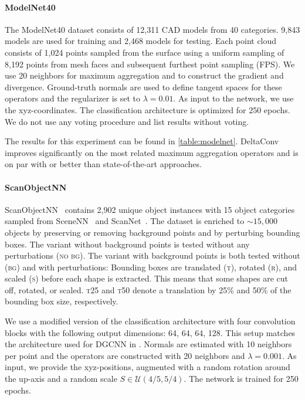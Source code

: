 \documentclass[acmtog, authorversion]{acmart}
\begin{document}
\paragraph{ModelNet40}
The ModelNet40 dataset \cite{Wu2015} consists of 12,311 CAD models from 40 categories. 9,843 models are used for training and 2,468 models for testing. Each point cloud consists of 1,024 points sampled from the surface using a uniform sampling of 8,192 points from mesh faces and subsequent furthest point sampling (FPS). We use 20 neighbors for maximum aggregation and to construct the gradient and divergence. Ground-truth normals are used to define tangent spaces for these operators and the regularizer is set to $\lambda=0.01$. As input to the network, we use the xyz-coordinates. The classification architecture is optimized for 250 epochs. We do not use any voting procedure and list results without voting.

The results for this experiment can be found in \autoref{table:modelnet}. DeltaConv improves significantly on the most related maximum aggregation operators and is on par with or better than state-of-the-art approaches.

\paragraph{ScanObjectNN}
ScanObjectNN~\cite{uy-scanobjectnn-iccv19} contains 2,902 unique object instances with 15 object categories sampled from SceneNN~\cite{scenenn-3dv16} and ScanNet~\cite{dai2017scannet}. The dataset is enriched to $\sim15,000$ objects by preserving or removing background points and by perturbing bounding boxes. The variant without background points is tested without any perturbations (\textsc{no bg}). The variant with background points is both tested without (\textsc{bg}) and with perturbations: Bounding boxes are translated (\textsc{t}), rotated (\textsc{r}), and scaled (\textsc{s}) before each shape is extracted. This means that some shapes are cut off, rotated, or scaled. \textsc{t25} and \textsc{t50} denote a translation by 25\% and 50\% of the bounding box size, respectively.

We use a modified version of the classification architecture with four convolution blocks with the following output dimensions: 64, 64, 64, 128. This setup matches the architecture used for DGCNN in \cite{uy-scanobjectnn-iccv19}. Normals are estimated with 10 neighbors per point and the operators are constructed with 20 neighbors and $\lambda = 0.001$. As input, we provide the xyz-positions, augmented with a random rotation around the up-axis and a random scale $S \in \mathcal{U}(4/5, 5/4)$. The network is trained for 250 epochs.
\end{document}
